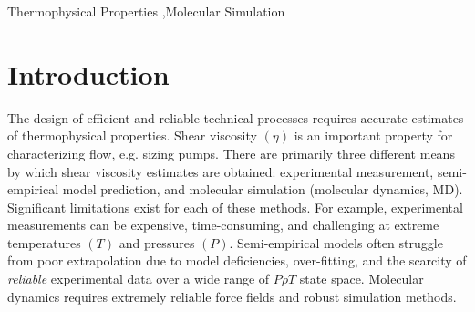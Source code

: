 \documentclass[preprint,review,12pt]{elsarticle}
\begin{document}
\begin{frontmatter}
\begin{abstract}
			
		\end{abstract}
		
		\begin{keyword}
			
			
			
			Thermophysical Properties \sep Molecular Simulation
			
		\end{keyword}
		
	\end{frontmatter}	
	
%	
%	
%	
%	
%	
	
	\section{Introduction}
	
	The design of efficient and reliable technical processes requires accurate estimates of thermophysical properties. Shear viscosity $(\eta)$ is an important property for characterizing flow, e.g. sizing pumps. There are primarily three different means by which shear viscosity estimates are obtained: experimental measurement, semi-empirical model prediction, and molecular simulation (molecular dynamics, MD). Significant limitations exist for each of these methods. For example, experimental measurements can be expensive, time-consuming, and challenging at extreme temperatures $(T)$ and pressures $(P)$. Semi-empirical models often struggle from poor extrapolation due to model deficiencies, over-fitting, and the scarcity of \textit{reliable} experimental data over a wide range of $P \rho T$ state space. Molecular dynamics requires extremely reliable force fields and robust simulation methods.
	
\end{document}
